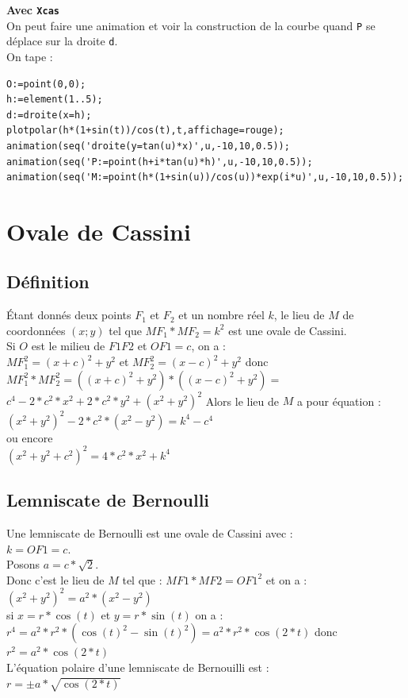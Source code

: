 \documentclass[a4paper,11pt]{book}
\begin{document}
{\bf Avec {\tt Xcas}}\\
On peut faire une animation et voir la construction de la courbe quand 
{\tt P} se d\'eplace sur la droite {\tt d}.\\
On tape :
\begin{verbatim}
O:=point(0,0);
h:=element(1..5);
d:=droite(x=h);
plotpolar(h*(1+sin(t))/cos(t),t,affichage=rouge);
animation(seq('droite(y=tan(u)*x)',u,-10,10,0.5));
animation(seq('P:=point(h+i*tan(u)*h)',u,-10,10,0.5));
animation(seq('M:=point(h*(1+sin(u))/cos(u))*exp(i*u)',u,-10,10,0.5));
\end{verbatim}

\section{Ovale de Cassini}
\subsection{D\'efinition}
\'Etant donn\'es deux points $F_1$ et $F_2$ et un nombre r\'eel $k$, le lieu 
de $M$ de coordonn\'ees $(x;y)$ tel que $MF_1*MF_2=k^2$ est une ovale de 
Cassini.\\
Si $O$ est le milieu de $F1F2$ et $OF1=c$, on a :\\
$MF_1^2=(x+c)^2+y^2$ et $MF_2^2=(x-c)^2+y^2$ donc\\
$MF_1^2*MF_2^2=((x+c)^2+y^2)*((x-c)^2+y^2)=$\\
$c^4-2*c^2*x^2+2*c^2*y^2+(x^2+y^2)^2$
Alors le lieu de $M$ a pour \'equation : 
$(x^2+y^2)^2-2*c^2*(x^2-y^2)=k^4-c^4$\\
ou encore \\
$(x^2+y^2+c^2)^2=4*c^2*x^2+k^4$\\

\subsection{Lemniscate de Bernoulli}
Une lemniscate de Bernoulli est une ovale de Cassini avec :\\
$k=OF1=c$.\\
Posons $a=c*\sqrt2$.\\
 Donc c'est le lieu de $M$ tel que : $MF1*MF2=OF1^2$ et on a :\\
$(x^2+y^2)^2=a^2*(x^2-y^2)$\\
si 
$x=r*\cos(t)$ et $y=r*\sin(t)$ on a :
$r^4=a^2*r^2*(\cos(t)^2-\sin(t)^2)=a^2*r^2*\cos(2*t)$
donc \\
$r^2=a^2*\cos(2*t)$\\
L'\'equation polaire d'une lemniscate de Bernouilli est :\\
$r=\pm a*\sqrt{\cos(2*t)}$
\end{document}
